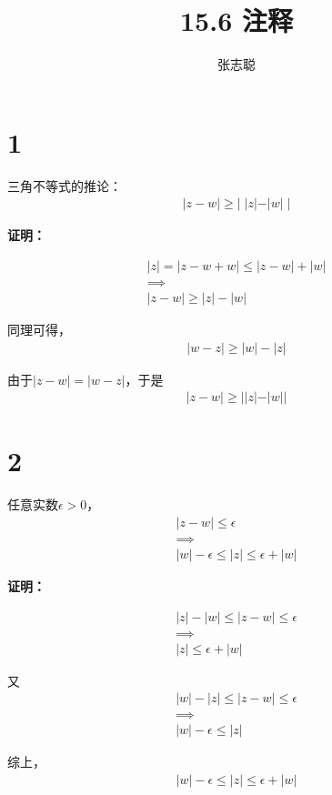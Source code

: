 \documentclass{article}
\begin{document}
\title{15.6 注释}
\author{张志聪}
\maketitle

\section*{1}

\begin{zremark}
  三角不等式的推论：
  \begin{align*}
    |z - w| \geq  | \; |z| - |w| \; |
  \end{align*}
\end{zremark}

\textbf{证明：}

\begin{align*}
  |z| = |z - w + w| \leq |z - w| + |w| \\
  \implies                             \\
  |z - w| \geq |z| - |w|
\end{align*}

同理可得，
\begin{align*}
  |w - z| \geq |w| - |z|
\end{align*}

由于$|z - w| = |w - z|$，于是
\begin{align*}
  |z - w| \geq ||z| - |w||
\end{align*}

\section*{2}
\begin{zremark}
  任意实数$\epsilon > 0$，
  \begin{align*}
    |z - w| \leq \epsilon \\
    \implies              \\
    |w| - \epsilon \leq |z| \leq \epsilon + |w|
  \end{align*}
\end{zremark}

\textbf{证明：}

\begin{align*}
  |z| - |w| \leq |z - w| \leq \epsilon \\
  \implies                             \\
  |z| \leq \epsilon + |w|
\end{align*}

又
\begin{align*}
  |w| - |z| \leq |z - w| \leq \epsilon \\
  \implies                             \\
  |w| - \epsilon \leq |z|
\end{align*}

综上，
\begin{align*}
  |w| - \epsilon \leq |z| \leq \epsilon + |w|
\end{align*}
\end{document}
